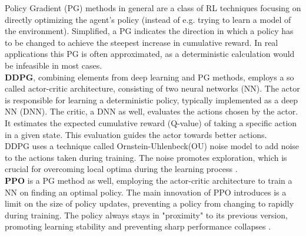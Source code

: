 Policy Gradient (PG) methods in general are a class of RL techniques focusing on directly optimizing the agent's policy (instead of e.g. trying to learn a model of the environment).
Simplified, a PG indicates the direction in which a policy has to be changed to achieve the steepest increase in cumulative reward.
In real applications this PG is often approximated, as a deterministic calculation would be infeasible in most cases.\\
\textbf{DDPG}, combining elements from deep learning and PG methods, employs a so called actor-critic architecture, consisting of two neural networks (NN).
The actor is responsible for learning a deterministic policy, typically implemented as a deep NN (DNN).
The critic, a DNN as well, evaluates the actions chosen by the actor. It estimates the expected cumulative reward (Q-value) of taking a specific action in a given state.
This evaluation guides the actor towards better actions.\\
DDPG uses a technique called Ornstein-Uhlenbeck(OU) noise model to add noise to the actions taken during training.
The noise promotes exploration, which is crucial for overcoming local optima during the learning process \parencite{openAI_DDPG}.\\
\textbf{PPO} is a PG method as well, employing the actor-critic architecture to train a NN on finding an optimal policy.
The main innovation of PPO introduces is a limit on the size of policy updates, preventing a policy from changing to rapidly during training.
The policy always stays in "proximity" to its previous version, promoting learning stability and preventing sharp performance collapses \parencite{openAI_PPO}.\\


